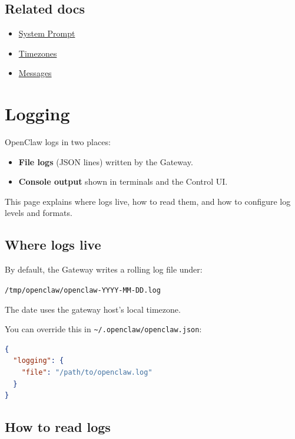 \subsection{Related docs}


\begin{itemize}
  \item \href{/concepts/system-prompt}{System Prompt}
  \item \href{/concepts/timezone}{Timezones}
  \item \href{/concepts/messages}{Messages}
\end{itemize}



\clearpage

\section{Logging}


OpenClaw logs in two places:

\begin{itemize}
  \item \textbf{File logs} (JSON lines) written by the Gateway.
  \item \textbf{Console output} shown in terminals and the Control UI.
\end{itemize}


This page explains where logs live, how to read them, and how to configure log
levels and formats.

\subsection{Where logs live}


By default, the Gateway writes a rolling log file under:

\texttt{/tmp/openclaw/openclaw-YYYY-MM-DD.log}

The date uses the gateway host's local timezone.

You can override this in \texttt{\textasciitilde{}/.openclaw/openclaw.json}:

\begin{lstlisting}[language=json]
{
  "logging": {
    "file": "/path/to/openclaw.log"
  }
}
\end{lstlisting}


\subsection{How to read logs}


